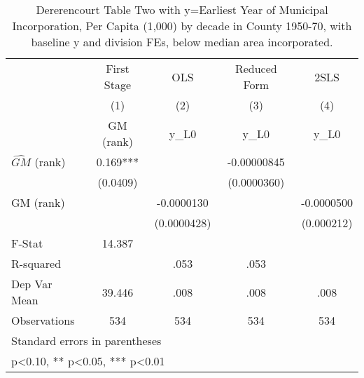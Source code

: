 \begin{table}[htbp]\centering
\def\sym#1{\ifmmode^{#1}\else\(^{#1}\)\fi}
\caption{Dererencourt Table Two with y=Earliest Year of Municipal Incorporation, Per Capita (1,000) by decade in County 1950-70, with baseline y and division FEs, below median area incorporated.}
\begin{tabular}{l*{4}{c}}
\toprule
                    & First Stage   &         OLS   &Reduced Form   &        2SLS   \\
                    &\multicolumn{1}{c}{(1)}&\multicolumn{1}{c}{(2)}&\multicolumn{1}{c}{(3)}&\multicolumn{1}{c}{(4)}\\
                    &\multicolumn{1}{c}{GM  (rank)}&\multicolumn{1}{c}{y\_L0}&\multicolumn{1}{c}{y\_L0}&\multicolumn{1}{c}{y\_L0}\\
\midrule
$\hat{GM}$ (rank)   &       0.169***&               & -0.00000845   &               \\
                    &    (0.0409)   &               & (0.0000360)   &               \\
\addlinespace
GM  (rank)          &               &  -0.0000130   &               &  -0.0000500   \\
                    &               & (0.0000428)   &               &  (0.000212)   \\
\midrule
F-Stat              &      14.387   &               &               &               \\
R-squared           &               &        .053   &        .053   &               \\
Dep Var Mean        &      39.446   &        .008   &        .008   &        .008   \\
Observations        &         534   &         534   &         534   &         534   \\
\bottomrule
\multicolumn{5}{l}{\footnotesize Standard errors in parentheses}\\
\multicolumn{5}{l}{\footnotesize * p<0.10, ** p<0.05, *** p<0.01}\\
\end{tabular}
\end{table}
